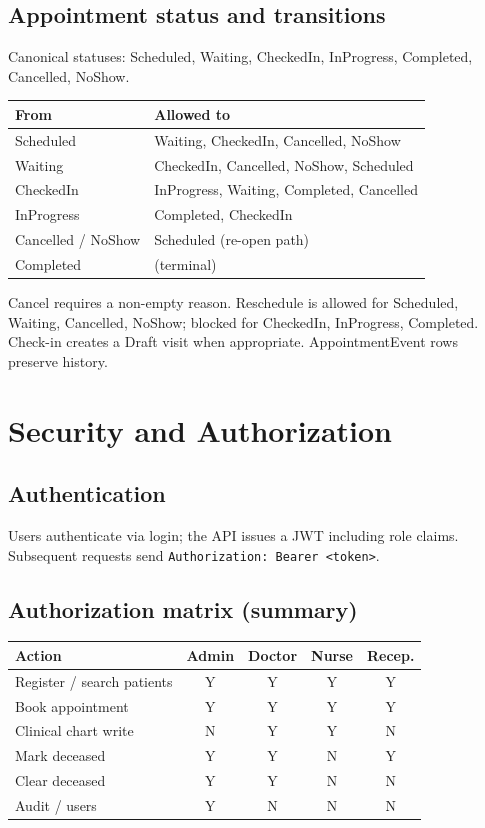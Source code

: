 \documentclass[11pt,a4paper]{article}
\begin{document}
\subsection{Appointment status and transitions}
Canonical statuses: Scheduled, Waiting, CheckedIn, InProgress, Completed, Cancelled, NoShow.

\begin{tabularx}{\textwidth}{@{}p{2.8cm}X@{}}
\toprule
\textbf{From} & \textbf{Allowed to} \\
\midrule
Scheduled & Waiting, CheckedIn, Cancelled, NoShow \\
Waiting & CheckedIn, Cancelled, NoShow, Scheduled \\
CheckedIn & InProgress, Waiting, Completed, Cancelled \\
InProgress & Completed, CheckedIn \\
Cancelled / NoShow & Scheduled (re-open path) \\
Completed & (terminal) \\
\bottomrule
\end{tabularx}

\vspace{0.4em}
\noindent Cancel requires a non-empty reason. Reschedule is allowed for Scheduled, Waiting, Cancelled, NoShow; blocked for CheckedIn, InProgress, Completed. Check-in creates a Draft visit when appropriate. AppointmentEvent rows preserve history.

\section{Security and Authorization}

\subsection{Authentication}
Users authenticate via login; the API issues a JWT including role claims. Subsequent requests send \texttt{Authorization: Bearer <token>}.

\subsection{Authorization matrix (summary)}

\begin{tabularx}{\textwidth}{@{}Xcccc@{}}
\toprule
\textbf{Action} & \textbf{Admin} & \textbf{Doctor} & \textbf{Nurse} & \textbf{Recep.} \\
\midrule
Register / search patients & Y & Y & Y & Y \\
Book appointment & Y & Y & Y & Y \\
Clinical chart write & N & Y & Y & N \\
Mark deceased & Y & Y & N & Y \\
Clear deceased & Y & Y & N & N \\
Audit / users & Y & N & N & N \\
\bottomrule
\end{tabularx}
\end{document}
